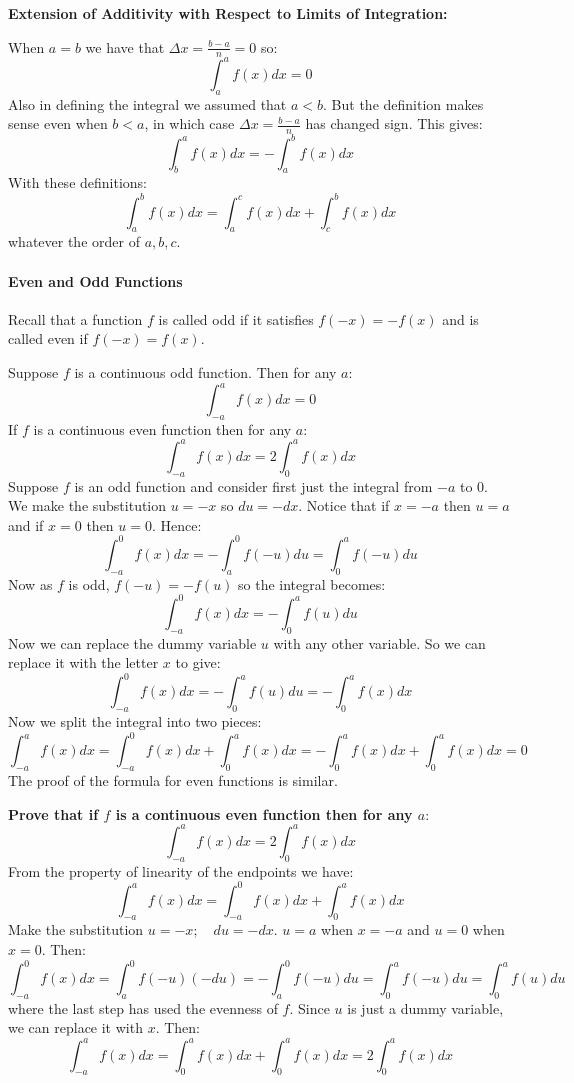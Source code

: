 \textbf{Extension of Additivity with Respect to Limits of Integration:}



When $a = b$ we have that $\Delta x = \frac{b-a}{n} = 0$ so:
$$
\int_a^a f(x) dx = 0
$$
Also in defining the integral we assumed that $a < b$. But the definition makes sense even when $b < a$, in which case $\Delta x = \frac{b-a}{n}$ has changed sign. This gives:
$$
\int_b^a f(x) dx = -\int_a^b f(x) dx
$$
With these definitions:
$$
\int_a^b f(x) dx = \int_a^c f(x) dx + \int_c^b f(x) dx
$$
whatever the order of $a,b,c$.



\paragraph{Even and Odd Functions}



Recall that a function $f$ is called odd if it satisfies $f(-x) = -f(x)$ and is called even if $f(-x) = f(x)$.



Suppose $f$ is a continuous odd function. Then for any $a$:
$$
\int_{-a}^a f(x) dx = 0
$$
If $f$ is a continuous even function then for any $a$:
$$
\int_{-a}^a f(x) dx = 2 \int_0^a f(x) dx
$$
Suppose $f$ is an odd function and consider first just the integral from $-a$ to $0$. We make the substitution $u = -x$ so $du = -dx$. Notice that if $x = -a$ then $u = a$ and if $x = 0$ then $u = 0$. Hence:
$$
\int_{-a}^0 f(x) dx = -\int_a^0 f(-u) du = \int_0^a f(-u) du
$$
Now as $f$ is odd, $f(-u) = -f(u)$ so the integral becomes:
$$
\int_{-a}^0 f(x) dx = -\int_0^a f(u) du
$$
Now we can replace the dummy variable $u$ with any other variable. So we can replace it with the letter $x$ to give:
$$
\int_{-a}^0 f(x) dx = -\int_0^a f(u) du = -\int_0^a f(x) dx
$$
Now we split the integral into two pieces:
$$
\int_{-a}^a f(x) dx = \int_{-a}^0 f(x) dx + \int_0^a f(x) dx = -\int_0^a f(x) dx + \int_0^a f(x) dx = 0
$$
The proof of the formula for even functions is similar.



\textbf{Prove that if $f$ is a continuous even function then for any $a$}:
$$
\int_{-a}^a f(x) dx = 2 \int_0^a f(x) dx
$$
From the property of linearity of the endpoints we have:
$$
\int_{-a}^a f(x) dx = \int_{-a}^0 f(x) dx + \int_0^a f(x) dx
$$
Make the substitution $u = -x; \quad du = -dx$. $u = a$ when $x = -a$ and $u = 0$ when $x = 0$. Then:
$$
\int_{-a}^0 f(x) dx = \int_a^0 f(-u)(-du) = -\int_a^0 f(-u) du = \int_0^a f(-u) du = \int_0^a f(u) du
$$
where the last step has used the evenness of $f$. Since $u$ is just a dummy variable, we can replace it with $x$. Then:
$$
\int_{-a}^a f(x) dx = \int_0^a f(x) dx + \int_0^a f(x) dx = 2 \int_0^a f(x) dx
$$
